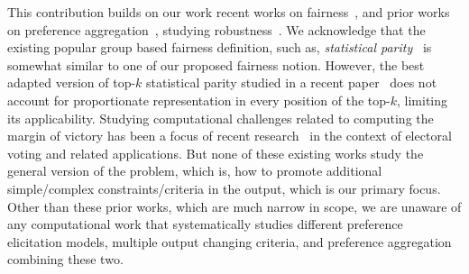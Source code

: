\documentclass[11pt]{article}
\begin{document}
This contribution builds on our work recent works on fairness~\cite{islam2022satisfying, wei2022rank}, and prior works on preference aggregation~\cite{amer2009group, amer2015group, basu2015group}, studying robustness~\cite{roy2014exploiting}. We acknowledge that the existing popular group based fairness definition, such as, {\em statistical parity}~\cite{dwork2012fairness} is somewhat similar to one of our proposed fairness notion. However, the best adapted version of top-$k$ statistical parity studied in a recent paper~\cite{vldbrank} does not account for proportionate representation in every position of the top-$k$, limiting its applicability.  Studying computational challenges related to computing the margin of victory  has been a focus of recent research~\cite{stv1,stv2, stv3} in the context of electoral voting and related applications. But none of these existing works study the general version of the problem, which is, how to promote additional simple/complex constraints/criteria in the output, which is our primary focus. Other than these prior works, which are  much narrow in scope, we are unaware of any computational work that systematically studies different preference elicitation models, multiple output changing criteria, and preference aggregation combining these two.  


\end{document}
